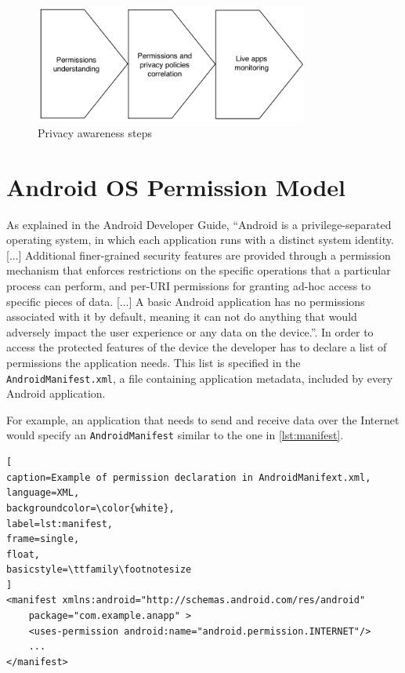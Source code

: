 \begin{figure}[tb]
\centering
     \includegraphics[width=0.8\textwidth]{images/awareness-steps}
      \caption{Privacy awareness steps}
      \label{fig:awareness-steps}
\end{figure}


\section{Android OS Permission Model}
\label{sec:android-permission-model}
As explained in the Android Developer Guide, ``Android is a privilege-separated operating system, in which each application runs with a distinct system identity. [...]
Additional finer-grained security features are provided through a permission mechanism that enforces restrictions on the specific operations that a particular process can perform, and per-URI permissions for granting ad-hoc access to specific pieces of data. [...]
A basic Android application has no permissions associated with it by default, meaning it can not do anything that would adversely impact the user experience or any data on the device.''\cite{android-developer-guide}.
In order to access the protected features of the device the developer has to declare a list of permissions the application needs. This list is specified in the \texttt{AndroidManifest.xml}, a file containing application metadata, included by every Android application.

For example, an application that needs to send and receive data over the Internet would specify an \texttt{AndroidManifest} similar to the one in \autoref{lst:manifest}.

\begin{lstlisting}[
caption=Example of permission declaration in AndroidManifext.xml,
language=XML,
backgroundcolor=\color{white},
label=lst:manifest,
frame=single,
float,
basicstyle=\ttfamily\footnotesize
]
<manifest xmlns:android="http://schemas.android.com/res/android"
    package="com.example.anapp" >
    <uses-permission android:name="android.permission.INTERNET"/>
    ...
</manifest>
\end{lstlisting}

